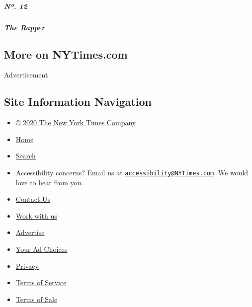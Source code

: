 \href{https://www.nytimes3xbfgragh.onion/interactive/2019/05/30/magazine/princess-nokia-new-york.html}{}

\hypertarget{nuxba-12}{%
\subparagraph{Nº. 12}\label{nuxba-12}}

\hypertarget{the-rapper}{%
\subparagraph{The Rapper}\label{the-rapper}}

\hypertarget{more-on-nytimescom}{%
\subsection{More on NYTimes.com}\label{more-on-nytimescom}}

Advertisement

\hypertarget{site-information-navigation}{%
\subsection{Site Information
Navigation}\label{site-information-navigation}}

\begin{itemize}
\tightlist
\item
  \href{https://help.nytimes3xbfgragh.onion/hc/en-us/articles/115014792127-Copyright-notice}{©
  2020 The New York Times Company}
\item
  \href{https://www.nytimes3xbfgragh.onion}{Home}
\item
  \href{https://www.nytimes3xbfgragh.onion/search/}{Search}
\item
  Accessibility concerns? Email us at
  \href{mailto:accessibility@NYTimes.com}{\nolinkurl{accessibility@NYTimes.com}}.
  We would love to hear from you.
\item
  \href{https://help.nytimes3xbfgragh.onion/hc/en-us/articles/115015385887-Contact-Us}{Contact
  Us}
\item
  \href{https://www.nytco.com/careers/}{Work with us}
\item
  \href{https://nytmediakit.com/}{Advertise}
\item
  \href{https://help.nytimes3xbfgragh.onion/hc/en-us/articles/115014892108-Privacy-policy\#pp}{Your
  Ad Choices}
\item
  \href{https://help.nytimes3xbfgragh.onion/hc/en-us/articles/115014892108-Privacy-policy}{Privacy}
\item
  \href{https://help.nytimes3xbfgragh.onion/hc/en-us/articles/115014893428-Terms-of-service}{Terms
  of Service}
\item
  \href{https://help.nytimes3xbfgragh.onion/hc/en-us/articles/115014893968-Terms-of-sale}{Terms
  of Sale}
\end{itemize}

